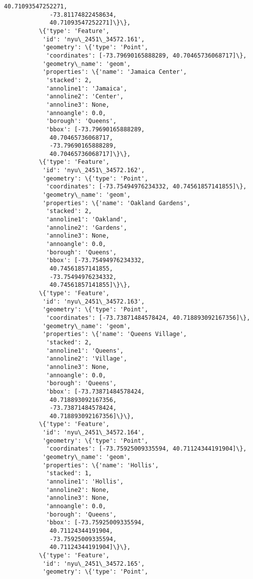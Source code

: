 \documentclass[11pt]{article}
\begin{document}
\begin{Verbatim}[commandchars=\\\{\}]
             40.71093547252271,
             -73.81174822458634,
             40.71093547252271]\}\},
          \{'type': 'Feature',
           'id': 'nyu\_2451\_34572.161',
           'geometry': \{'type': 'Point',
            'coordinates': [-73.79690165888289, 40.70465736068717]\},
           'geometry\_name': 'geom',
           'properties': \{'name': 'Jamaica Center',
            'stacked': 2,
            'annoline1': 'Jamaica',
            'annoline2': 'Center',
            'annoline3': None,
            'annoangle': 0.0,
            'borough': 'Queens',
            'bbox': [-73.79690165888289,
             40.70465736068717,
             -73.79690165888289,
             40.70465736068717]\}\},
          \{'type': 'Feature',
           'id': 'nyu\_2451\_34572.162',
           'geometry': \{'type': 'Point',
            'coordinates': [-73.75494976234332, 40.74561857141855]\},
           'geometry\_name': 'geom',
           'properties': \{'name': 'Oakland Gardens',
            'stacked': 2,
            'annoline1': 'Oakland',
            'annoline2': 'Gardens',
            'annoline3': None,
            'annoangle': 0.0,
            'borough': 'Queens',
            'bbox': [-73.75494976234332,
             40.74561857141855,
             -73.75494976234332,
             40.74561857141855]\}\},
          \{'type': 'Feature',
           'id': 'nyu\_2451\_34572.163',
           'geometry': \{'type': 'Point',
            'coordinates': [-73.73871484578424, 40.718893092167356]\},
           'geometry\_name': 'geom',
           'properties': \{'name': 'Queens Village',
            'stacked': 2,
            'annoline1': 'Queens',
            'annoline2': 'Village',
            'annoline3': None,
            'annoangle': 0.0,
            'borough': 'Queens',
            'bbox': [-73.73871484578424,
             40.718893092167356,
             -73.73871484578424,
             40.718893092167356]\}\},
          \{'type': 'Feature',
           'id': 'nyu\_2451\_34572.164',
           'geometry': \{'type': 'Point',
            'coordinates': [-73.75925009335594, 40.71124344191904]\},
           'geometry\_name': 'geom',
           'properties': \{'name': 'Hollis',
            'stacked': 1,
            'annoline1': 'Hollis',
            'annoline2': None,
            'annoline3': None,
            'annoangle': 0.0,
            'borough': 'Queens',
            'bbox': [-73.75925009335594,
             40.71124344191904,
             -73.75925009335594,
             40.71124344191904]\}\},
          \{'type': 'Feature',
           'id': 'nyu\_2451\_34572.165',
           'geometry': \{'type': 'Point',

\end{Verbatim}
\end{document}
